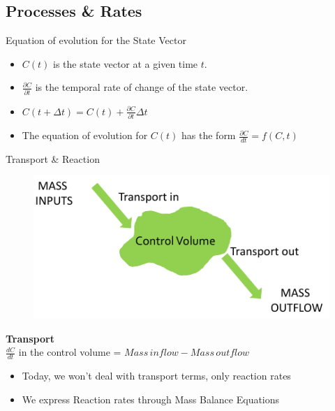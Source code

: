 \documentclass[final,xcolor=dvipsnames]{beamer}
\begin{document}
      \subsection{Processes \& Rates}
      \begin{frame}
	\begin{block}{Equation of evolution for the State Vector}
	  \begin{itemize}[<+->]
	    \item $C(t)$ is the state vector at a given time $t$.
	    \item $\frac{\partial C}{\partial t}$ is the temporal rate of change of the state vector. 
	    \item $C(t+\Delta t) = C(t) + \frac{\partial C}{\partial t}\Delta t$ 
	    \item The equation of evolution for $C(t)$ has the form  $\frac{\partial C}{dt} = f(C,t)$ 
	  \end{itemize}
	\end{block}
      \end{frame}
      
      \begin{frame}
	\begin{block}{Transport \& Reaction}
	  \begin{figure}
	    \includegraphics[width=.5\framewidth]{TransportReaction}
	  \end{figure}
	  \textbf{Transport} \\
	  $\frac{d C}{dt}$ in the control volume = $Mass\,inflow - Mass\,outflow$ \\
	  \begin{itemize}
	    \item<3>Today, we won't deal with \alert{transport terms}, only \alert{reaction rates}
	    \item<4> We express Reaction rates through \alert{Mass Balance Equations}
	  \end{itemize}
	\end{block}
      \end{frame}
      
\end{document}
